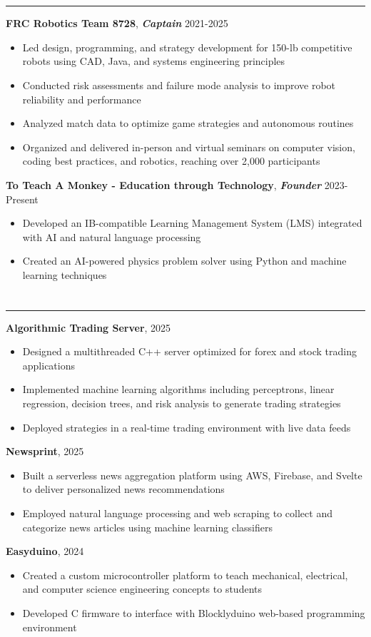 \documentclass{article}[11pt]
\newcommand{\underlinedsection}[1]{ \section*{\sc{#1}}
	\rule{\textwidth}{1pt} }
\newenvironment{denseitemize} %
{ \begin{itemize}[leftmargin = 20pt, topsep = 0pt, itemsep = 0pt] }
{\end{itemize} }
\newcommand{\job}[3]{ {\textbf{#1}, \textit{\textbf{#2}} \hfill {#3}} }
\begin{document}
\underlinedsection{Other Experience}
\job{FRC Robotics Team 8728}{Captain}{2021-2025}
\begin{denseitemize}
	\item Led design, programming, and strategy development for 150-lb competitive robots using CAD, Java, and systems engineering principles
    \item Conducted risk assessments and failure mode analysis to improve robot reliability and performance
    \item Analyzed match data to optimize game strategies and autonomous routines
    \item Organized and delivered in-person and virtual seminars on computer vision, coding best practices, and robotics, reaching over 2,000 participants
\end{denseitemize}
\job{To Teach A Monkey - Education through Technology}{Founder}{2023-Present}
\begin{denseitemize}
	\item Developed an IB-compatible Learning Management System (LMS) integrated with AI and natural language processing
    \item Created an AI-powered physics problem solver using Python and machine learning techniques
\end{denseitemize}
\underlinedsection{Projects}
\job{Algorithmic Trading Server}{}{2025}
\begin{denseitemize}
	\item Designed a multithreaded C++ server optimized for forex and stock trading applications
    \item Implemented machine learning algorithms including perceptrons, linear regression, decision trees, and risk analysis to generate trading strategies
    \item Deployed strategies in a real-time trading environment with live data feeds
\end{denseitemize}
\job{Newsprint}{}{2025}
\begin{denseitemize}
	\item Built a serverless news aggregation platform using AWS, Firebase, and Svelte to deliver personalized news recommendations
    \item Employed natural language processing and web scraping to collect and categorize news articles using machine learning classifiers
\end{denseitemize}
\job{Easyduino}{}{2024}
\begin{denseitemize}
	\item Created a custom microcontroller platform to teach mechanical, electrical, and computer science engineering concepts to students
    \item Developed C firmware to interface with Blocklyduino web-based programming environment
\end{denseitemize}


\thispagestyle{empty}
\end{document}
